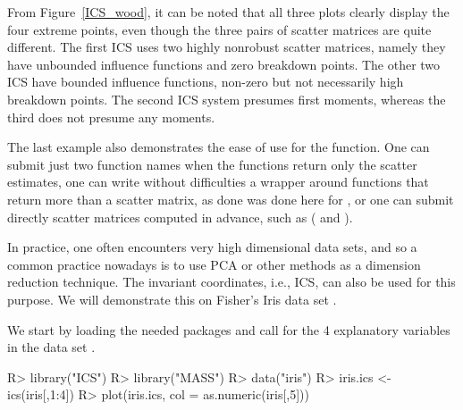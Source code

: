 \documentclass[article,nojss]{jss}
\begin{document}
From Figure~\ref{ICS_wood}, it can be noted that all three plots clearly display the four extreme points, even though the three pairs of
scatter matrices are quite different. The first {ICS} uses two highly nonrobust scatter matrices, namely they have
unbounded influence functions and zero breakdown points. The other two {ICS} have bounded influence functions, non-zero but not
necessarily high breakdown points. The second {ICS} system presumes first moments, whereas the third does not presume any moments.

The last example also demonstrates the ease of use for the  function. One can submit just two function names when the functions return
only the scatter estimates, one can write without difficulties a wrapper around functions that return more than a scatter matrix, as done was
done here for , or one can submit directly scatter matrices computed in advance, such as ( and
).

In practice, one often encounters very high dimensional data sets, and so a common practice nowadays is to use {PCA} or
other methods as a dimension reduction technique. The invariant coordinates, i.e., {ICS}, can also be used for this purpose.
We will demonstrate this on Fisher's Iris data set \citep{Fisher1936}.

We start by loading the needed packages and call for the 4 explanatory variables in the data set .
\begin{Schunk}
\begin{Sinput}
R> library("ICS")
R> library("MASS")
R> data("iris")
R> iris.ics <- ics(iris[,1:4])
R> plot(iris.ics, col = as.numeric(iris[,5]))
\end{Sinput}
\end{Schunk}
\end{document}
